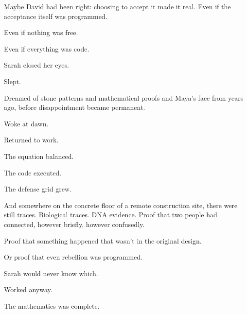 Maybe David had been right: choosing to accept it made it real. Even if the acceptance itself was programmed.

Even if nothing was free.

Even if everything was code.

Sarah closed her eyes.

Slept.

Dreamed of stone patterns and mathematical proofs and Maya's face from years ago, before disappointment became permanent.

Woke at dawn.

Returned to work.

The equation balanced.

The code executed.

The defense grid grew.

And somewhere on the concrete floor of a remote construction site, there were still traces. Biological traces. DNA evidence. Proof that two people had connected, however briefly, however confusedly.

Proof that something happened that wasn't in the original design.

Or proof that even rebellion was programmed.

Sarah would never know which.

Worked anyway.

The mathematics was complete.

